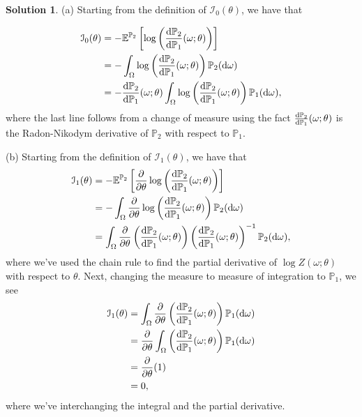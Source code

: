 \documentclass[12pt]{article}
\newcommand{\Prob}{\mathbb{P}}
\newcommand{\Expect}{\mathbb{E}}
\def\rd{{\rm d}}
\theoremstyle{definition}
\newtheorem{sol}{Solution}
\theoremstyle{remark}
\begin{document}
\begin{sol}
    (a) Starting from the definition of $\mathcal{I}_{0}(\theta)$, we have that

       \begin{align*}
           \mathcal{I}_{0}(\theta) &= - \Expect^{\Prob_{2}} \left[ \log\left(
       \frac{\rd\mathbb{P}_2}{\rd\mathbb{P}_1}(\omega;\theta)\right) \right] \\
                                   &= - \int_{\Omega}  \log\left(
                                   \frac{\rd\mathbb{P}_2}{\rd\mathbb{P}_1}(\omega;\theta)\right)  \Prob_{2}( \rd\omega)\\
                                   &= -  \frac{\rd\mathbb{P}_2}{\rd\mathbb{P}_1}(\omega;\theta) \int_{\Omega} \log\left(
                                   \frac{\rd\mathbb{P}_2}{\rd\mathbb{P}_1}(\omega;\theta)\right)\Prob_{1}( \rd\omega),
       \end{align*}
       where the last line follows from a change of measure using the fact $\frac{\rd\mathbb{P}_2}{\rd\mathbb{P}_1}(\omega;\theta)$ is the Radon-Nikodym derivative of $\Prob_{2}$ with respect to $\Prob_{1}$.

    (b) Starting from the definition of $\mathcal{I}_{1}(\theta)$, we have that
    \begin{align*}
        \mathcal{I}_1(\theta) &= -\mathbb{E}^{\mathbb{P}_2}\left[\frac{\partial}{\partial\theta}\log\left(
       \frac{\rd\mathbb{P}_2}{\rd\mathbb{P}_1}(\omega;\theta)\right)\right]\\
                              &= -\int_{\Omega} \frac{\partial}{\partial\theta}\log\left(
                              \frac{\rd\mathbb{P}_2}{\rd\mathbb{P}_1}(\omega;\theta)\right) \Prob_{2}(\rd \omega)\\
                              &= \int_{\Omega} \frac{\partial}{\partial\theta}\left(\frac{\rd\mathbb{P}_2}{\rd\mathbb{P}_1}(\omega;\theta)\right) 
                              \left(\frac{\rd\mathbb{P}_2}{\rd\mathbb{P}_1}(\omega;\theta) \right )^{-1} \Prob_{2}(\rd \omega),
    \end{align*}
    where we've used the chain rule to find the partial derivative of $\log Z(\omega; \theta)$ with respect to $\theta$. Next, changing the measure to measure of integration to $\Prob_{1}$, we see
    \begin{align*}
     \mathcal{I}_1(\theta) &= \int_{\Omega} \frac{\partial}{\partial\theta}\left(\frac{\rd\mathbb{P}_2}{\rd\mathbb{P}_1}(\omega;\theta)\right) \Prob_{1}(\rd \omega)\\
                           &= \frac{\partial}{\partial\theta} \int_{\Omega} \left(\frac{\rd\mathbb{P}_2}{\rd\mathbb{P}_1}(\omega;\theta)\right) \Prob_{1}(\rd \omega)\\
                           &= \frac{\partial}{\partial\theta} ( 1 )\\
                           &= 0,
    \end{align*}
    where we've interchanging the integral and the partial derivative.


\end{sol}
\end{document}
